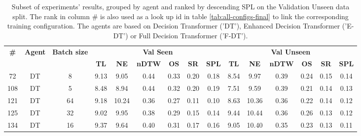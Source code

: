 \begin{table}
\centering
\caption{\label{tab:batch_test}Subset of experiments' results, grouped by agent and ranked by descending SPL on the Validation Unseen data split. The rank in column \# is also used as a look up id in table \ref{tab:all-configs-final} to link the corresponding training configuration.     \newline The agents are based on Decision Transformer ('DT'), Enhanced Decision Transformer ('E-DT') or Full Decision Transformer ('F-DT').}
\begin{tabular}{@{\hskip3pt}c@{\hskip3pt}c@{\hskip3pt}c@{\hskip3pt}c@{\hskip3pt}c@{\hskip3pt}c@{\hskip3pt}c@{\hskip3pt}c@{\hskip3pt}c@{\hskip3pt}c@{\hskip3pt}c@{\hskip3pt}c@{\hskip3pt}c@{\hskip3pt}c@{\hskip3pt}c}
\toprule
\textbf{\#} & \textbf{Agent} & \textbf{Batch size} & \multicolumn{6}{c}{\textbf{Val Seen}} & \multicolumn{6}{c}{\textbf{Val Unseen}} \\
\cmidrule(l){4-9} \cmidrule(l){10-15} \textbf{~} &     \textbf{~} &          \textbf{~} &       \textbf{TL} & \textbf{NE} & \textbf{nDTW} & \textbf{OS} & \textbf{SR} & \textbf{SPL} &         \textbf{TL} & \textbf{NE} & \textbf{nDTW} & \textbf{OS} & \textbf{SR} & \textbf{SPL} \\
\midrule
         72 &             DT &                   8 &              9.13 &        9.05 &          0.44 &        0.33 &        0.20 &         0.18 &                8.54 &        9.97 &          0.39 &        0.24 &        0.15 &         0.14 \\
        108 &             DT &                   5 &              8.48 &        8.94 &          0.44 &        0.32 &        0.20 &         0.19 &                7.51 &        9.59 &          0.39 &        0.21 &        0.14 &         0.13 \\
        121 &             DT &                  64 &              9.18 &       10.24 &          0.36 &        0.27 &        0.11 &         0.10 &                8.63 &       10.36 &          0.36 &        0.22 &        0.14 &         0.12 \\
        125 &             DT &                  32 &              9.02 &        9.95 &          0.38 &        0.29 &        0.15 &         0.14 &                9.44 &       10.44 &          0.36 &        0.26 &        0.13 &         0.12 \\
        134 &             DT &                  16 &              9.37 &        9.64 &          0.40 &        0.31 &        0.17 &         0.16 &                9.05 &       10.40 &          0.35 &        0.23 &        0.13 &         0.11 \\

\end{tabular}
\end{table}
